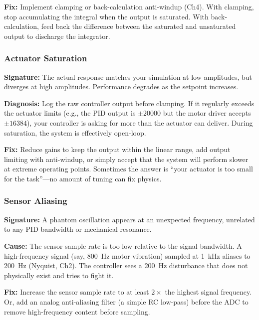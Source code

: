 \textbf{Fix:} Implement clamping or back-calculation anti-windup (Ch4). With clamping, stop accumulating the integral when the output is saturated. With back-calculation, feed back the difference between the saturated and unsaturated output to discharge the integrator.

\subsubsection{Actuator Saturation}

\textbf{Signature:} The actual response matches your simulation at low amplitudes, but diverges at high amplitudes. Performance degrades as the setpoint increases.

\textbf{Diagnosis:} Log the raw controller output before clamping. If it regularly exceeds the actuator limits (e.g., the PID output is $\pm 20000$ but the motor driver accepts $\pm 16384$), your controller is asking for more than the actuator can deliver. During saturation, the system is effectively open-loop.

\textbf{Fix:} Reduce gains to keep the output within the linear range, add output limiting with anti-windup, or simply accept that the system will perform slower at extreme operating points. Sometimes the answer is ``your actuator is too small for the task''---no amount of tuning can fix physics.

\subsubsection{Sensor Aliasing}

\textbf{Signature:} A phantom oscillation appears at an unexpected frequency, unrelated to any PID bandwidth or mechanical resonance.

\textbf{Cause:} The sensor sample rate is too low relative to the signal bandwidth. A high-frequency signal (say, 800~Hz motor vibration) sampled at 1~kHz aliases to 200~Hz (Nyquist, Ch2). The controller sees a 200~Hz disturbance that does not physically exist and tries to fight it.

\textbf{Fix:} Increase the sensor sample rate to at least $2\times$ the highest signal frequency. Or, add an analog anti-aliasing filter (a simple RC low-pass) before the ADC to remove high-frequency content before sampling.

